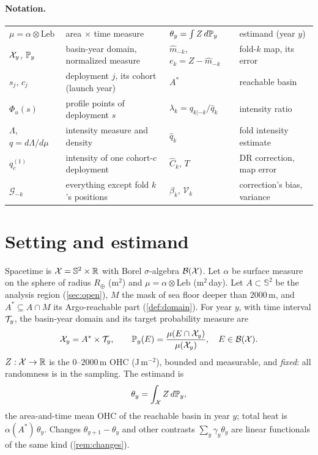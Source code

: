 \paragraph{Notation.}
\begin{center}\footnotesize
\begin{tabular}{@{}ll@{\qquad}ll@{}}
\toprule
$\mu=\alpha\otimes\mathrm{Leb}$ & area $\times$ time measure &
$\theta_y=\int Z\,d\mathbb{P}_y$ & estimand (year $y$)\\
$\mathcal{X}_y$, $\mathbb{P}_y$ & basin-year domain, normalized measure &
$\hat m_{-k}$, $e_k=Z-\hat m_{-k}$ & fold-$k$ map, its error\\
$s_j$, $c_j$ & deployment $j$, its cohort (launch year) &
$A^*$ & reachable basin\\
$\Phi_u(s)$ & profile points of deployment $s$ &
$\lambda_k=q_{k|-k}/\hat q_k$ & intensity ratio\\
$\Lambda$, $q=d\Lambda/d\mu$ & intensity measure and density &
$\hat q_k$ & fold intensity estimate\\
$q^{(1)}_c$ & intensity of one cohort-$c$ deployment &
$\hat C_k$, $T$ & DR correction, map error\\
$\mathcal G_{-k}$ & everything except fold $k$'s positions &
$\beta_k$, $\mathcal V_k$ & correction's bias, variance\\
\bottomrule
\end{tabular}
\end{center}

\section{Setting and estimand}\label{sec:setting}

Spacetime is $\mathcal{X}=\mathbb S^2\times\mathbb{R}$ with Borel $\sigma$-algebra $\mathcal{B}(\mathcal{X})$. Let $\alpha$ be surface
measure on the sphere of radius $R_\oplus$ (m$^2$) and $\mu=\alpha\otimes\mathrm{Leb}$ (m$^2$\,day).
Let $A\subset\mathbb S^2$ be the analysis region (\cref{sec:open}), $M$ the mask of sea floor deeper
than $2000$\,m, and $A^*\subseteq A\cap M$ its Argo-reachable part (\cref{def:domain}). For year $y$,
with time interval $\mathcal{T}_y$, the basin-year domain and its target probability measure are
\[
  \mathcal{X}_y=A^*\times\mathcal{T}_y,\qquad \mathbb{P}_y(E)=\frac{\mu(E\cap\mathcal{X}_y)}{\mu(\mathcal{X}_y)},\quad E\in\mathcal{B}(\mathcal{X}).
\]
$Z:\mathcal{X}\to\mathbb{R}$ is the $0$--$2000$\,m OHC (J\,m$^{-2}$), bounded and measurable, and \emph{fixed}: all
randomness is in the sampling. The estimand is
\[
  \theta_y=\int_{\mathcal{X}} Z\,d\mathbb{P}_y ,
\]
the area-and-time mean OHC of the reachable basin in year $y$; total heat is $\alpha(A^*)\,\theta_y$.
Changes $\theta_{y+1}-\theta_y$ and other contrasts $\sum_y\gamma_y\theta_y$ are linear functionals
of the same kind (\cref{rem:changes}).

